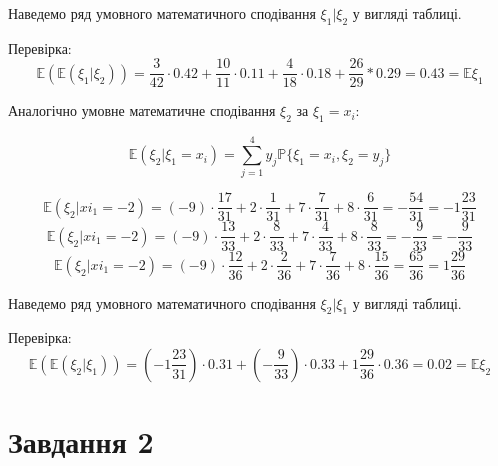 \documentclass[14pt, a4paper, ukrainian]{extreport}
\begin{document}
	Наведемо ряд умовного математичного сподівання $\xi_1|\xi_2$ у вигляді таблиці.
	\begin{table}[H]
		\caption{\label{tab:E1|E2}Умовне математичне сподівання $\xi_1|\xi_2=y_j$}
		\begin{center}
		\end{center}	
	\end{table}
	
	Перевірка:
	$$\mathbb{E}(\mathbb{E}(\xi_1|\xi_2)) = \frac{3}{42} \cdot 0.42 + \frac{10}{11} \cdot 0.11 + \frac{4}{18} \cdot 0.18 + \frac{26}{29} * 0.29 = 0.43 = \mathbb{E}\xi_1$$
	
	Аналогічно умовне математичне сподівання $\xi_2$ за $\xi_1=x_i$:
	
	$$\mathbb{E}(\xi_2|\xi_1 = x_i) = \sum_{j=1}^{4}y_j\mathbb{P}\{\xi_1=x_i, \xi_2 = y_j\}$$
	
	$$ \mathbb{E}(\xi_2|xi_1=-2) = (-9) \cdot \frac{17}{31} + 2 \cdot \frac{1}{31} + 7 \cdot \frac{7}{31} + 8 \cdot \frac{6}{31} = -\frac{54}{31} = -1\frac{23}{31}$$
	$$ \mathbb{E}(\xi_2|xi_1=-2) = (-9) \cdot \frac{13}{33} + 2 \cdot \frac{8}{33} + 7 \cdot \frac{4}{33} + 8 \cdot \frac{8}{33} = -\frac{9}{33} = -\frac{9}{33}$$
	$$ \mathbb{E}(\xi_2|xi_1=-2) = (-9) \cdot \frac{12}{36} + 2 \cdot \frac{2}{36} + 7 \cdot \frac{7}{36} + 8 \cdot \frac{15}{36} = \frac{65}{36} = 1\frac{29}{36}$$
	
	Наведемо ряд умовного математичного сподівання $\xi_2|\xi_1$ у вигляді таблиці.
	\begin{table}[H]
		\caption{\label{tab:E2|E1}Умовне математичне сподівання $\xi_2|\xi_1=x_i$}
		\begin{center}
		\end{center}	
	\end{table}
	
	Перевірка:
	$$ \mathbb{E}(\mathbb{E}(\xi_2|\xi_1)) = (-1\frac{23}{31}) \cdot 0.31 + (-\frac{9}{33}) \cdot 0.33 + 1\frac{29}{36} \cdot 0.36 = 0.02 = \mathbb{E}\xi_2 $$
	
	
	\chapter{Завдання 2}
	
	
\end{document}
